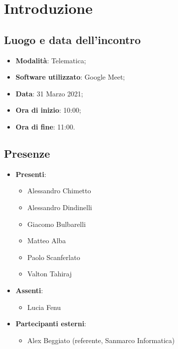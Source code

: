 \documentclass[]{article}
\begin{document}
	

	\newpage


	\section{Introduzione}
	\subsection{Luogo e data dell'incontro}
	\begin{itemize}
		\item \textbf{Modalità}: Telematica;
		\item \textbf{Software utilizzato}: Google Meet;
		\item \textbf{Data}: 31 Marzo 2021;
		\item \textbf{Ora di inizio}: 10:00;
		\item \textbf{Ora di fine}: 11:00.
	\end{itemize}

	\subsection{Presenze}
	\begin{itemize}
		\item \textbf{Presenti}:
		\begin{itemize}
			\item Alessandro Chimetto
			\item Alessandro Dindinelli	
			\item Giacomo Bulbarelli
			\item Matteo Alba
			\item Paolo Scanferlato
			\item Valton Tahiraj

		\end{itemize}
		\item \textbf{Assenti}:
		\begin{itemize}
			\item Lucia Fenu

		\end{itemize}
		\item \textbf{Partecipanti esterni}:
		\begin{itemize}
			\item Alex Beggiato (referente, Sanmarco Informatica)
		\end{itemize}
	\end{itemize}
\end{document}
